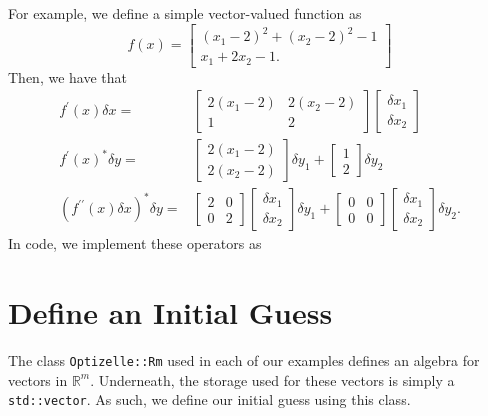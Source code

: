 \documentclass{report}
\newcommand{\re}{\mathbb{R}}
\begin{document}
        For example, we define a simple vector-valued function as
$$
    f(x)=\begin{bmatrix}
        (x_1-2)^2 + (x_2-2)^2 - 1\\
        x_1 + 2x_2 - 1.
    \end{bmatrix}
$$
Then, we have that
\begin{align*}
    f^\prime(x)\delta x=&\begin{bmatrix}
        2(x_1-2) & 2(x_2-2)\\
        1 & 2
    \end{bmatrix}\begin{bmatrix}\delta x_1\\\delta x_2\end{bmatrix}\\
    f^\prime(x)^*\delta y=&
        \begin{bmatrix}
            2(x_1-2)\\
            2(x_2-2)
        \end{bmatrix}  \delta y_1
        +
        \begin{bmatrix}
            1\\
            2
        \end{bmatrix} \delta y_2\\
    (f^{\prime\prime}(x)\delta x)^*\delta y=&
        \begin{bmatrix}
            2 & 0\\
            0 & 2
        \end{bmatrix}\begin{bmatrix}\delta x_1\\\delta x_2\end{bmatrix}
            \delta y_1
        +\begin{bmatrix}
            0 & 0\\
            0 & 0
        \end{bmatrix}\begin{bmatrix}\delta x_1\\\delta x_2\end{bmatrix}
            \delta y_2.
\end{align*}
In code, we implement these operators as


\section{Define an Initial Guess} 

        The class \texttt{Optizelle::Rm} used in each of our examples defines an algebra for vectors in $\re^m$.  Underneath, the storage used for these vectors is simply a \texttt{std::vector}.  As such, we define our initial guess using this class.
\end{document}
